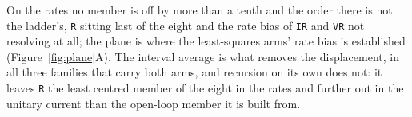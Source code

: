 On the rates no member is off by more than a tenth and the order there is not the ladder's,
\texttt{R} sitting last of the eight and the rate bias of \texttt{IR} and \texttt{VR} not resolving
at all; the plane is where the least-squares arms' rate bias is established
(Figure~\ref{fig:plane}A).
The interval average is what
removes the displacement, in all three families that carry both arms, and recursion on its own does
not: it leaves \texttt{R} the least centred member of the eight in the rates and further out in the
unitary current than the open-loop member it is built from. %

